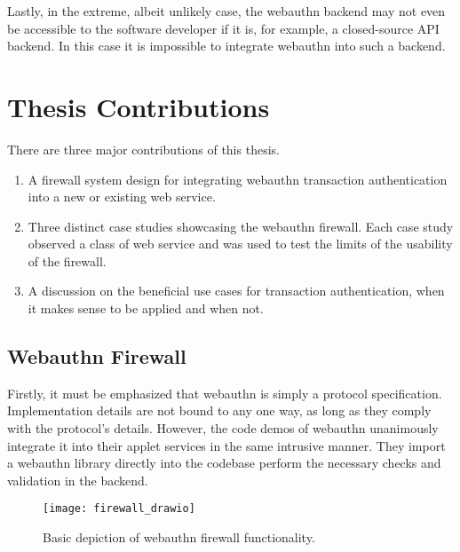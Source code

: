 Lastly, in the extreme, albeit unlikely case, the webauthn backend may not even be accessible to the software developer if it is, for example, a closed-source API backend. In this case it is impossible to integrate webauthn into such a backend.

\section{Thesis Contributions}

There are three major contributions of this thesis. 

\begin{enumerate}[nosep]

\item A firewall system design for integrating webauthn transaction authentication into a new or existing web service.

\item Three distinct case studies showcasing the webauthn firewall. Each case study observed a class of web service and was used to test the limits of the usability of the firewall.

\item A discussion on the beneficial use cases for transaction authentication, when it makes sense to be applied and when not.

\end{enumerate}


\subsection{Webauthn Firewall}

Firstly, it must be emphasized that webauthn is simply a protocol specification. Implementation details are not bound to any one way, as long as they comply with the protocol's details. However, the code demos of webauthn unanimously integrate it into their applet services in the same intrusive manner. They import a webauthn library \cite{TODO-webauthn-libraries} directly into the codebase perform the necessary checks and validation in the backend.

\begin{figure}[h]
  \centering
  \texttt{[image: firewall\_drawio]}
  \caption{Basic depiction of webauthn firewall functionality.}
\end{figure}

